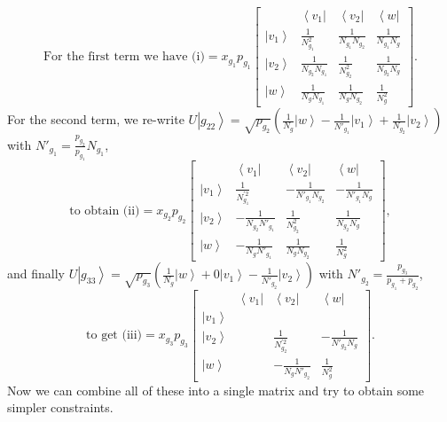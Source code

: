 \documentclass{theoretics}
\begin{document}
\begin{displaymath}\text{For the first term we have }
\text{(i)}=x_{g_{1}}p_{g_{1}}\left[\begin{array}{c|ccc}
& \left\langle v_{1}\right| & \left\langle v_{2}\right| & \left\langle w\right|\\
\hline \left|v_{1}\right\rangle  & \frac{1}{N_{g_{1}}^{2}} & \frac{1}{N_{g_{1}}N_{g_{2}}} & \frac{1}{N_{g_{1}}N_{g}}\\
\left|v_{2}\right\rangle  & \frac{1}{N_{g_{2}}N_{g_{1}}} & \frac{1}{N_{g_{2}}^{2}} & \frac{1}{N_{g_{2}}N_{g}}\\
\left|w\right\rangle  & \frac{1}{N_{g}N_{g_{1}}} & \frac{1}{N_{g}N_{g_{2}}} & \frac{1}{N_{g}^{2}}
\end{array}\right].
\end{displaymath}
For the second term, we re-write $U\left|g_{22}\right\rangle =\sqrt{p_{g_{2}}}\left(\frac{1}{N_{g}}\left|w\right\rangle -\frac{1}{N'_{g_{1}}}\left|v_{1}\right\rangle +\frac{1}{N_{g_{2}}}\left|v_{2}\right\rangle \right)$
with 
$
N'_{g_{1}}=\frac{p_{g_{2}}}{p_{g_{1}}}N_{g_{1}}
$, \begin{displaymath}
\text{to obtain  (ii)}=x_{g_{2}}p_{g_{2}}\left[\begin{array}{c|ccc}
& \left\langle v_{1}\right| & \left\langle v_{2}\right| & \left\langle w\right|\\
\hline \left|v_{1}\right\rangle  & \frac{1}{N_{g_{1}}^{\prime2}} & -\frac{1}{N'_{g_{1}}N_{g_{2}}} & -\frac{1}{N'_{g_{1}}N_{g}}\\
\left|v_{2}\right\rangle  & -\frac{1}{N_{g_{2}}N'_{g_{1}}} & \frac{1}{N_{g_{2}}^{2}} & \frac{1}{N_{g_{2}}N_{g}}\\
\left|w\right\rangle  & -\frac{1}{N_{g}N'_{g_{1}}} & \frac{1}{N_{g}N_{g_{2}}} & \frac{1}{N_{g}^{2}}
\end{array}\right],
\end{displaymath}
and finally $U\left|g_{33}\right\rangle =\sqrt{p_{g_{3}}}\left(\frac{1}{N_{g}}\left|w\right\rangle +0\left|v_{1}\right\rangle -\frac{1}{N'_{g_{2}}}\left|v_{2}\right\rangle \right)$
with 
$
N'_{g_{2}}=\frac{p_{g_{3}}}{p_{g_{1}}+p_{g_{2}}}
$,\begin{displaymath}
\text{to get  (iii)}=x_{g_{3}}p_{g_{3}}\left[\begin{array}{c|ccc}
& \left\langle v_{1}\right| & \left\langle v_{2}\right| & \left\langle w\right|\\
\hline \left|v_{1}\right\rangle \\
\left|v_{2}\right\rangle  &  & \frac{1}{N_{g_{2}}^{\prime2}} & -\frac{1}{N'_{g_{2}}N_{g}}\\
\left|w\right\rangle  &  & -\frac{1}{N_{g}N'_{g_{2}}} & \frac{1}{N_{g}^{2}}
\end{array}\right].
\end{displaymath}
Now we can combine all of these into a single matrix and try to obtain
some simpler constraints.
\end{document}
